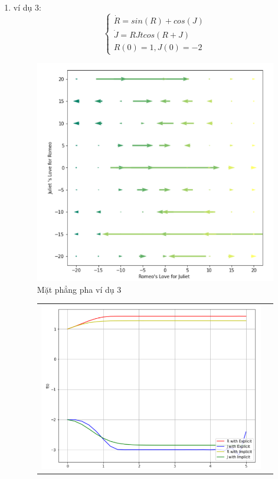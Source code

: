 \documentclass[a4paper]{article}
\begin{document}
\begin{enumerate}
\begin{enumerate}
\item ví dụ 3:
    \begin{equation} \label{ex:vd3}
        \begin{cases}
            \dot{R} = sin(R)+cos(J) \\
            \dot{J} = RJtcos(R+J)\\
            R(0) = 1, J(0) = -2
        \end{cases}
    \end{equation}
    \begin{figure}[htp]
    \centering
    \includegraphics[scale = .8]{Images/Bt4/vd3/field.png}
    \caption{Mặt phẳng pha ví dụ 3}
\end{figure} 
\newpage
\begin{figure}[htp] 
    \begin{tabular}{cc}
        \includegraphics[scale=.58]{Images/Bt4/vd3/h=0,2.png} &

\end{tabular}
\end{figure}
\end{enumerate}
\end{enumerate}
\end{document}
